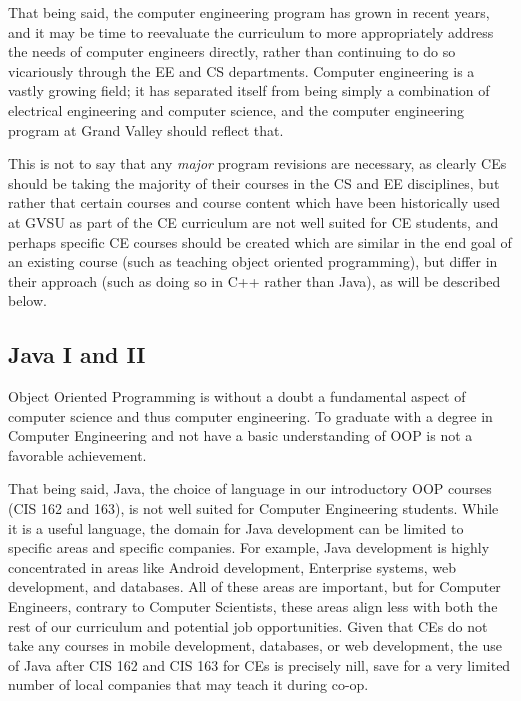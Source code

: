 \documentclass[12pt]{article}
\numberwithin{figure}{section}
\numberwithin{equation}{section}
\begin{document}
{\bigskip

That being said, the computer engineering program has grown in recent
years, and it may be time to reevaluate the curriculum to more
appropriately address the needs of computer engineers directly, rather
than continuing to do so vicariously through the EE and CS departments.
Computer engineering is a vastly growing field; it has separated itself
from being simply a combination of electrical engineering and computer
science, and the computer engineering program at Grand Valley should
reflect that.

\bigskip

This is not to say that any \emph{major} program revisions are
necessary, as clearly CEs should be taking the majority of their courses
in the CS and EE disciplines, but rather that certain courses and course
content which have been historically used at GVSU as part of the CE
curriculum are not well suited for CE students, and perhaps specific CE
courses should be created which are similar in the end goal of an existing course
(such as teaching object oriented programming), but differ in their
approach (such as doing so in C++ rather than Java), as will be
described below.

\subsection{Java I and II}\label{java}
Object Oriented Programming is without a doubt a fundamental aspect of
computer science and thus computer engineering. To graduate with a
degree in Computer Engineering and not have a basic understanding of OOP
is not a favorable achievement.

\bigskip

That being said, Java, the choice of language in our introductory OOP
courses (CIS 162 and 163), is not well suited for Computer Engineering
students. While it is a useful language, the domain for Java development
can be limited to specific areas and specific companies. For example,
Java development is highly concentrated in areas like Android
development, Enterprise systems, web development, and databases. All of
these areas are important, but for Computer Engineers, contrary to
Computer Scientists, these areas align less with both the rest of our
curriculum and potential job opportunities. Given that CEs do not take
any courses in mobile development, databases, or web development, the
use of Java after CIS 162 and CIS 163 for CEs is precisely nill, save
for a very limited number of local companies that may teach it during
co-op.

}
\end{document}
